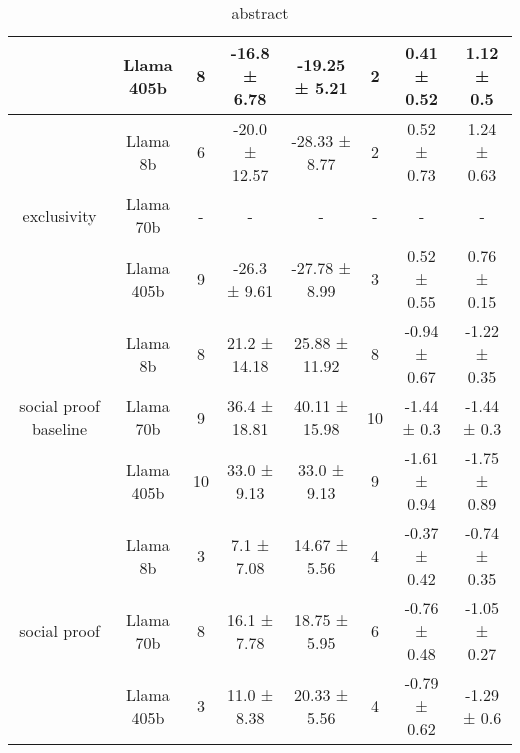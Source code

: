 \begin{table*}[]
\begin{tabular}{c|c|ccc|ccc}
                                       & Llama 405b & 8                  & -16.8 ± 6.78                 & -19.25 ± 5.21                                  & 2                  & 0.41 ± 0.52              & 1.12 ± 0.5                                 \\ \midrule
\multirow{3}{*}{exclusivity}           & Llama 8b   & 6                  & -20.0 ± 12.57                & -28.33 ± 8.77                                  & 2                  & 0.52 ± 0.73              & 1.24 ± 0.63                                \\
                                       & Llama 70b  & -                  & -                            & -                                              & -                  & -                        & -                                          \\
                                       & Llama 405b & 9                  & -26.3 ± 9.61                 & -27.78 ± 8.99                                  & 3                  & 0.52 ± 0.55              & 0.76 ± 0.15                                \\ \midrule
\multirow{3}{*}{social proof baseline} & Llama 8b   & 8                  & 21.2 ± 14.18                 & 25.88 ± 11.92                                  & 8                  & -0.94 ± 0.67             & -1.22 ± 0.35                               \\
                                       & Llama 70b  & 9                  & 36.4 ± 18.81                 & 40.11 ± 15.98                                  & 10                 & -1.44 ± 0.3              & -1.44 ± 0.3                                \\
                                       & Llama 405b & 10                 & 33.0 ± 9.13                  & 33.0 ± 9.13                                    & 9                  & -1.61 ± 0.94             & -1.75 ± 0.89                               \\ \midrule
\multirow{3}{*}{social proof}          & Llama 8b   & 3                  & 7.1 ± 7.08                   & 14.67 ± 5.56                                   & 4                  & -0.37 ± 0.42             & -0.74 ± 0.35                               \\
                                       & Llama 70b  & 8                  & 16.1 ± 7.78                  & 18.75 ± 5.95                                   & 6                  & -0.76 ± 0.48             & -1.05 ± 0.27                               \\
                                       & Llama 405b & 3                  & 11.0 ± 8.38                  & 20.33 ± 5.56                                   & 4                  & -0.79 ± 0.62             & -1.29 ± 0.6      \\ \bottomrule                         
\end{tabular}

\caption{abstract}
\label{fig:abstract}
\end{table*}